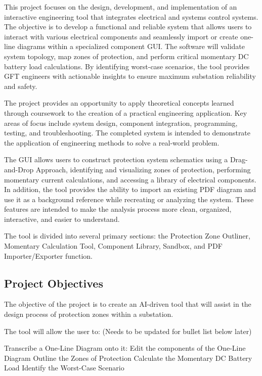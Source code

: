 This project focuses on the design, development, and implementation of an
interactive engineering tool that integrates electrical and systems control
systems. The objective is to develop a functional and reliable system
that allows users to interact with various electrical components and seamlessly import
or create one-line diagrams within a specialized component GUI. The software will validate 
system topology, map zones of protection, and perform critical momentary DC battery load 
calculations. By identifying worst-case scenarios, the tool provides GFT engineers with 
actionable insights to ensure maximum substation reliability and safety.


The project provides an opportunity to apply theoretical concepts learned
through coursework to the creation of a practical engineering application. Key areas of
focus include system design, component integration, programming, testing,
and troubleshooting. The completed system is intended to demonstrate the
application of engineering methods to solve a real-world problem.


The GUI allows users to construct protection system schematics using a Drag-and-Drop Approach, 
identifying and visualizing zones of protection, performing momentary current calculations, and 
accessing a library of electrical components. In addition, the tool provides the ability to 
import an existing PDF diagram and use it as a background reference while recreating or 
analyzing the system. These features are intended to make the analysis process more clean, 
organized, interactive, and easier to understand.


The tool is divided into several primary sections: the Protection Zone Outliner, Momentary 
Calculation Tool, Component Library, Sandbox, and PDF Importer/Exporter function.

\subsection{Project Objectives}
The objective of the project is to create an AI-driven tool that will assist in 
the design process of protection zones within a substation. 

The tool will allow the user to: (Needs to be updated for bullet list below later)

Transcribe a One-Line Diagram onto it:
Edit the components of the One-Line Diagram
Outline the Zones of Protection
Calculate the Momentary DC Battery Load
Identify the Worst-Case Scenario
